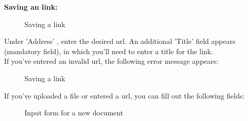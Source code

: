\vspace{\baselineskip}

\textbf{Saving an link:} 
\begin{figure}[H]
\caption{Saving a link}
\end{figure}

Under 'Address' , enter the desired url. An additional 'Title' field  appears (mandatory field), in which you'll need to enter a title for the link.\\

If you've entered an invalid url, the following error message appears:

\begin{figure}[H]
\caption{Saving a link}
\end{figure}

\vspace{\baselineskip}

If you've uploaded a file or entered a url, you can fill out the following fields:

\begin{figure}[H]
\caption{Input form for a new document}
\end{figure}

